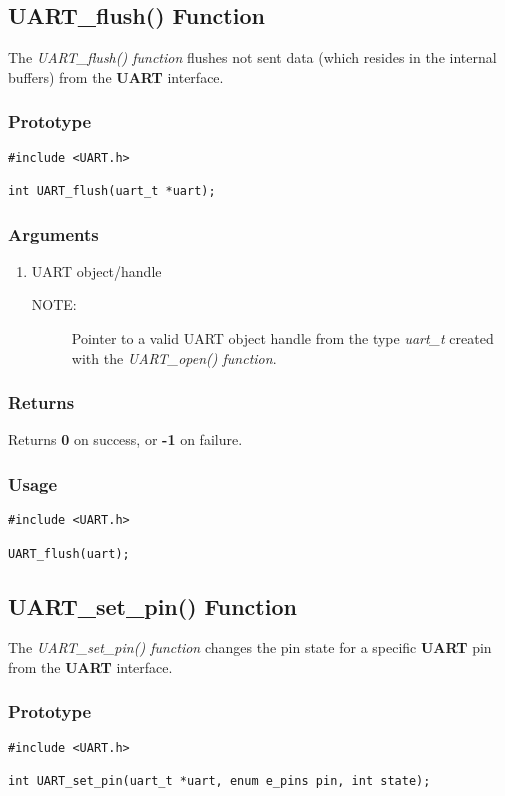 \documentclass{report}
\begin{document}
\subsection{UART\_flush() Function}
The \textit{UART\_flush() function} flushes not sent data (which
resides in the internal buffers) from the \textbf{UART} interface.
\subsubsection*{Prototype}
\begin{lstlisting}
#include <UART.h>

int UART_flush(uart_t *uart);
\end{lstlisting}
\subsubsection*{Arguments}
\begin{enumerate}
\item UART object/handle
\begin{description}
\item[NOTE:] Pointer to a valid UART object handle from the type \textit{uart\_t}
created with the \textit{UART\_open() function}.
\end{description}
\end{enumerate}
\subsubsection*{Returns}
Returns \textbf{0} on success, or \textbf{-1} on failure.
\subsubsection*{Usage}
\begin{lstlisting}
#include <UART.h>

UART_flush(uart);
\end{lstlisting}
\subsection{UART\_set\_pin() Function}
The \textit{UART\_set\_pin() function} changes the pin state for a
specific \textbf{UART} pin from the \textbf{UART} interface.
\subsubsection*{Prototype}
\begin{lstlisting}
#include <UART.h>

int UART_set_pin(uart_t *uart, enum e_pins pin, int state);
\end{lstlisting}
\end{document}
